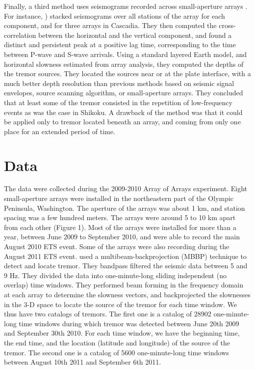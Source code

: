 \documentclass[draft]{agujournal2019}
\begin{document}
Finally, a third method uses seismograms recorded across small-aperture arrays \cite{GHO_2010_GRL, LAR_2009}. For instance, ) stacked seismograms over all stations of the array for each component, and for three arrays in Cascadia. They then computed the cross-correlation between the horizontal and the vertical component, and found a distinct and persistent peak at a positive lag time, corresponding to the time between P-wave and S-wave arrivals. Using a standard layered Earth model, and horizontal slowness estimated from array analysis, they computed the depths of the tremor sources. They located the sources near or at the plate interface, with a much better depth resolution than previous methods based on seismic signal envelopes, source scanning algorithm, or small-aperture arrays. They concluded that at least some of the tremor consisted in the repetition of low-frequency events as was the case in Shikoku. A drawback of the method was that it could be applied only to tremor located beneath an array, and coming from only one place for an extended period of time.

\section{Data}

The data were collected during the 2009-2010 Array of Arrays experiment. Eight small-aperture arrays were installed in the northeastern part of the Olympic Peninsula, Washington. The aperture of the arrays was about 1 km, and station spacing was a few hundred meters. The arrays were around 5 to 10 km apart from each other (Figure 1). Most of the arrays were installed for more than a year, between June 2009 to September 2010, and were able to record the main August 2010 ETS event. Some of the arrays were also recording during the August 2011 ETS event.  used a multibeam-backprojection (MBBP) technique to detect and locate tremor. They bandpass filtered the seismic data between 5 and 9 Hz. They divided the data into one-minute-long sliding independent (no overlap) time windows. They performed beam forming in the frequency domain at each array to determine the slowness vectors, and backprojected the slownesses in the 3-D space to locate the source of the tremor for each time window. We thus have two catalogs of tremors. The first one is a catalog of 28902 one-minute-long time windows during which tremor was detected between June 20th 2009 and September 30th 2010. For each time window, we have the beginning time, the end time, and the location (latitude and longitude) of the source of the tremor. The second one is a catalog of 5600 one-minute-long time windows between August 10th 2011 and September 6th 2011.
\end{document}
